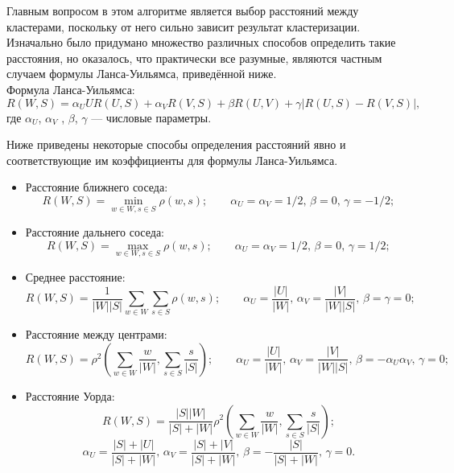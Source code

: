 \documentclass[article, 10pt]{disser}
\begin{document}
Главным вопросом в этом алгоритме является выбор расстояний между кластерами, поскольку от него сильно зависит результат кластеризации. Изначально было придумано множество различных способов определить такие расстояния, но оказалось, что практически все разумные, являются частным случаем формулы Ланса-Уильямса, приведённой ниже.\\
Формула Ланса-Уильямса:
\begin{equation*}
    R(W, S) = \alpha_{U}U R(U, S) + \alpha_{V} R(V, S) + \beta R(U, V) + \gamma|R(U, S) − R(V, S)|,
\end{equation*}
где $\alpha_{U}$, $\alpha_{V}$ , $\beta$, $\gamma$ --- числовые параметры.

Ниже приведены некоторые способы определения расстояний явно и соответствующие им коэффициенты для формулы Ланса-Уильямса.
\begin{itemize}
    \item Расстояние ближнего соседа:
    \begin{equation*}
        R(W, S) = \min\limits_{w\in W,s\in S}\rho(w, s);\quad\quad \alpha_U = \alpha_V = 1/2,\, \beta = 0,\, \gamma = −1/2;
    \end{equation*}
\item Расстояние дальнего соседа:
\begin{equation*}
R(W, S) = \max\limits_{w\in W,s\in S}\rho(w, s);\quad\quad \alpha_U = \alpha_V = 1/2,\, \beta = 0,\, \gamma = 1/2;
\end{equation*}
\item Среднее расстояние:
\begin{equation*}
R(W, S) = \frac{1}{|W||S|}\sum\limits_{w\in W}\sum\limits_{s\in S}\rho(w, s);\quad\quad \alpha_U = \frac{|U|}{|W|},\, \alpha_V = \frac{|V|}{|W||S|},\, \beta = \gamma = 0;
\end{equation*}
\item Расстояние между центрами:
\begin{equation*}
R(W, S) = \rho^{2}\left(\sum\limits_{w\in W}\frac{w}{|W|}, \sum\limits_{s\in S}\frac{s}{|S|}\right);\quad\quad \alpha_U = \frac{|U|}{|W|},\, \alpha_V = \frac{|V|}{|W||S|},\, \beta = -\alpha_{U}\alpha_{V},\, \gamma = 0;
\end{equation*}
\item Расстояние Уорда:
\begin{equation*}
R(W, S) = \frac{|S||W|}{|S|+|W|}\rho^{2}\left(\sum\limits_{w\in W}\frac{w}{|W|}, \sum\limits_{s\in S}\frac{s}{|S|}\right);
\end{equation*}
\begin{equation*}
\alpha_U = \frac{|S|+|U|}{|S|+|W|},\, \alpha_V = \frac{|S|+|V|}{|S|+|W|},\, \beta = -\frac{|S|}{|S|+|W|},\, \gamma = 0.
\end{equation*}
\end{itemize}
\end{document}
